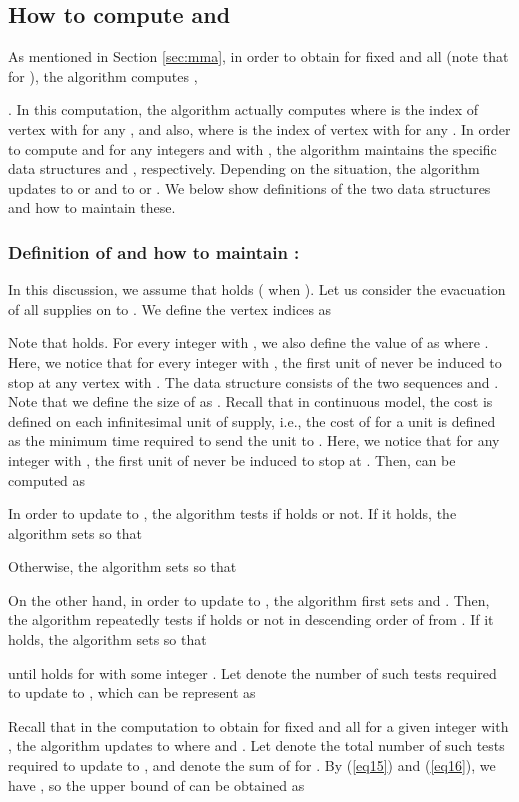 \documentclass[a4paper]{llncs}
\begin{document}
\subsection{How to compute  and }
\label{s2}
As mentioned in Section \ref{sec:mma}, in order to obtain  for fixed  and all 
(note that   for ), 
the algorithm computes ,

.
In this computation,
the algorithm actually computes 
where  is the index of vertex with  for any ,
and also, 
where  is the index of vertex with  for any .
In order to compute  and  for any integers  and  with , 
the algorithm maintains the specific data structures  and , respectively.
Depending on the situation, the algorithm updates  to  or  and  to  or .
We below show definitions of the two data structures and how to maintain these.

\subsubsection{Definition of  and how to maintain :} 
In this discussion, we assume that  holds ( when ).
Let us consider the evacuation of all supplies on  to .
We define the vertex indices  as 

Note that  holds. 
For every integer  with , we also define the value of  as  where .
Here, we notice that for every integer  with , the first unit of  never be induced to stop at any vertex  with .
The data structure  consists of the two sequences  and .
Note that we define the size of  as .
Recall that in continuous model, the cost is defined on each infinitesimal unit of supply,
i.e., the cost of  for a unit is defined as the minimum time required to send the unit to .
Here, we notice that for any integer  with , the first unit of  never be induced to stop at .
Then,  can be computed as 




In order to update  to , the algorithm tests if  holds or not. 
If it holds, the algorithm sets  so that

Otherwise, the algorithm sets  so that


On the other hand, in order to update  to , the algorithm first sets  and .
Then, the algorithm repeatedly tests if  holds or not in descending order of  from .
If it holds, the algorithm sets  so that

until  holds for  with some integer .
Let  denote the number of such tests required to update  to , which can be represent as


Recall that in the computation to obtain  for fixed  and all 
for a given integer  with , the algorithm updates  to  where  and .
Let  denote the total number of such tests required to update  to ,
and  denote the sum of  for .
By (\ref{eq15}) and (\ref{eq16}), we have , so the upper bound of  can be obtained as
\end{document}
